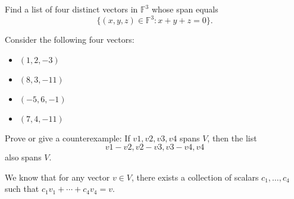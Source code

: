 \documentclass{zupan}
\begin{document}
\begin{exercise}{1}
  Find a list of four distinct vectors in \(\mathbb{F}^3\) whose span equals
  \[\{(x, y, z) \in \mathbb{F}^3 : x + y + z = 0\}.\]
\end{exercise}

\begin{solution}
  Consider the following four vectors:

  \begin{itemize}[noitemsep]
    \item \((1, 2, -3)\)
    \item \((8, 3, -11)\)
    \item \((-5, 6, -1)\)
    \item \((7, 4, -11)\)
  \end{itemize}
\end{solution}

\begin{exercise}{2}
  Prove or give a counterexample: If \(v1, v2, v3, v4\) spans \(V\), then the
  list \[v1 - v2, v2 - v3, v3 - v4, v4\] also spans \(V\).
\end{exercise}

\begin{solution}
  We know that for any vector \(v \in V\), there exists a collection of scalars
  \(c_1, \dots, c_4\) such that \(c_1v_1 + \cdots + c_4v_4 = v\).
\end{solution}
\end{document}
